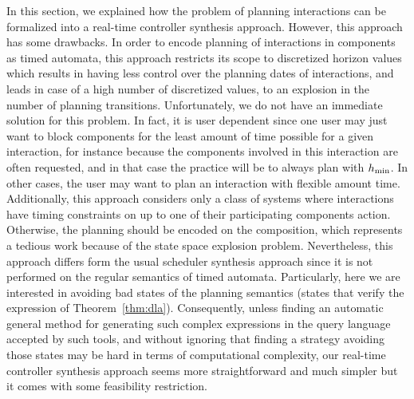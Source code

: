 In this section, we explained how the problem of planning interactions can be formalized into
a real-time controller synthesis approach. However, this approach has some drawbacks.
In order to encode planning of interactions in components as timed automata, this approach
restricts its scope to discretized horizon values which results in having less control
over the planning dates of interactions, and leads in case of a high number of discretized 
values, to an explosion in the number of planning transitions. Unfortunately, we do not 
have an immediate solution for this problem. In fact, it is user dependent since one user may 
just want to block components for the least amount of time possible for a given interaction, 
for instance because the components
involved in this interaction are often requested, and in that case the practice will be to 
always plan with $h_{\min}$. In other cases, the user may want to plan an interaction with 
flexible amount time.
Additionally, this approach considers only a class of systems where interactions have timing 
constraints on up to one of their participating components action. Otherwise, the planning 
should be encoded on the composition, which represents a tedious work because of the state 
space explosion problem. Nevertheless, this approach differs form the usual scheduler 
synthesis approach since it is not performed on the regular semantics of timed automata. 
Particularly, here we are interested in avoiding bad states of the planning semantics 
(states that verify the expression of Theorem~\ref{thm:dla}). Consequently, unless finding an 
automatic general method for generating such complex expressions in the query language accepted 
by such tools, and without ignoring that finding a strategy avoiding those states 
may be hard in terms of computational complexity, our real-time controller synthesis approach 
seems more straightforward and much simpler but it comes with some feasibility restriction.














